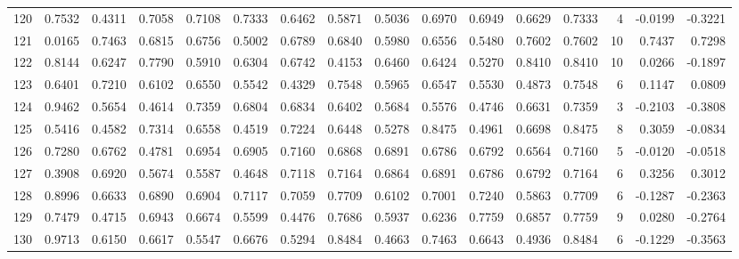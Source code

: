 \begin{tabular}{lrrrrrrrrrrrrrrr}
120 &      0.7532 &  0.4311 &  0.7058 &  0.7108 &  0.7333 &  0.6462 &  0.5871 &  0.5036 &  0.6970 &  0.6949 &   0.6629 &     0.7333 &      4 &                   -0.0199 &                    -0.3221 \\
121 &      0.0165 &  0.7463 &  0.6815 &  0.6756 &  0.5002 &  0.6789 &  0.6840 &  0.5980 &  0.6556 &  0.5480 &   0.7602 &     0.7602 &     10 &                    0.7437 &                     0.7298 \\
122 &      0.8144 &  0.6247 &  0.7790 &  0.5910 &  0.6304 &  0.6742 &  0.4153 &  0.6460 &  0.6424 &  0.5270 &   0.8410 &     0.8410 &     10 &                    0.0266 &                    -0.1897 \\
123 &      0.6401 &  0.7210 &  0.6102 &  0.6550 &  0.5542 &  0.4329 &  0.7548 &  0.5965 &  0.6547 &  0.5530 &   0.4873 &     0.7548 &      6 &                    0.1147 &                     0.0809 \\
124 &      0.9462 &  0.5654 &  0.4614 &  0.7359 &  0.6804 &  0.6834 &  0.6402 &  0.5684 &  0.5576 &  0.4746 &   0.6631 &     0.7359 &      3 &                   -0.2103 &                    -0.3808 \\
125 &      0.5416 &  0.4582 &  0.7314 &  0.6558 &  0.4519 &  0.7224 &  0.6448 &  0.5278 &  0.8475 &  0.4961 &   0.6698 &     0.8475 &      8 &                    0.3059 &                    -0.0834 \\
126 &      0.7280 &  0.6762 &  0.4781 &  0.6954 &  0.6905 &  0.7160 &  0.6868 &  0.6891 &  0.6786 &  0.6792 &   0.6564 &     0.7160 &      5 &                   -0.0120 &                    -0.0518 \\
127 &      0.3908 &  0.6920 &  0.5674 &  0.5587 &  0.4648 &  0.7118 &  0.7164 &  0.6864 &  0.6891 &  0.6786 &   0.6792 &     0.7164 &      6 &                    0.3256 &                     0.3012 \\
128 &      0.8996 &  0.6633 &  0.6890 &  0.6904 &  0.7117 &  0.7059 &  0.7709 &  0.6102 &  0.7001 &  0.7240 &   0.5863 &     0.7709 &      6 &                   -0.1287 &                    -0.2363 \\
129 &      0.7479 &  0.4715 &  0.6943 &  0.6674 &  0.5599 &  0.4476 &  0.7686 &  0.5937 &  0.6236 &  0.7759 &   0.6857 &     0.7759 &      9 &                    0.0280 &                    -0.2764 \\
130 &      0.9713 &  0.6150 &  0.6617 &  0.5547 &  0.6676 &  0.5294 &  0.8484 &  0.4663 &  0.7463 &  0.6643 &   0.4936 &     0.8484 &      6 &                   -0.1229 &                    -0.3563 \\

\end{tabular}
